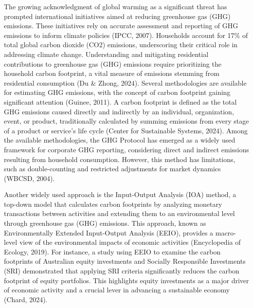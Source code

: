 \documentclass[12pt,a4paper]{article}%
\begin{document}
The growing acknowledgment of global warming as a significant threat has prompted international initiatives aimed at reducing greenhouse gas (GHG) emissions. These initiatives rely on accurate assessment and reporting of GHG emissions to inform climate policies (IPCC, 2007). Households account for 17\% of total global carbon dioxide (CO2) emissions, underscoring their critical role in addressing climate change. Understanding and mitigating residential contributions to greenhouse gas (GHG) emissions require prioritizing the household carbon footprint, a vital measure of emissions stemming from residential consumption (Du \& Zhong, 2024). Several methodologies are available for estimating GHG emissions, with the concept of carbon footprint gaining significant attention (Guinee, 2011). A carbon footprint is defined as the total GHG emissions caused directly and indirectly by an individual, organization, event, or product, traditionally calculated by summing emissions from every stage of a product or service's life cycle (Center for Sustainable Systems, 2024). Among the available methodologies, the GHG Protocol has emerged as a widely used framework for corporate GHG reporting, considering direct and indirect emissions resulting from household consumption. However, this method has limitations, such as double-counting and restricted adjustments for market dynamics (WBCSD, 2004). 


Another widely used approach is the Input-Output Analysis (IOA) method, a top-down model that calculates carbon footprints by analyzing monetary transactions between activities and extending them to an environmental level through greenhouse gas (GHG) emissions. This approach, known as Environmentally Extended Input-Output Analysis (EEIO), provides a macro-level view of the environmental impacts of economic activities (Encyclopedia of Ecology, 2019). For instance, a study using EEIO to examine the carbon footprints of Australian equity investments and Socially Responsible Investments (SRI) demonstrated that applying SRI criteria significantly reduces the carbon footprint of equity portfolios. This highlights equity investments as a major driver of economic activity and a crucial lever in advancing a sustainable economy (Chard, 2024).
\end{document}
